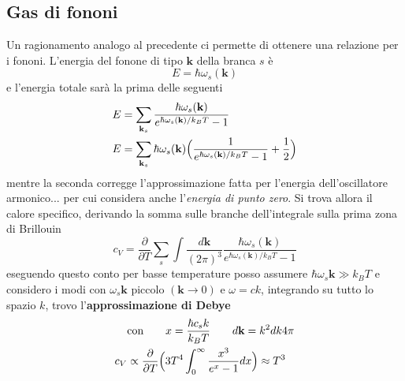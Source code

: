 \subsection{Gas di fononi}
Un ragionamento analogo al precedente ci permette di ottenere una relazione per i fononi.
L'energia del fonone di tipo $\textbf{k}$ della branca $s$ è
\begin{equation}
E = \hbar \omega_s (\textbf{k})
\end{equation}
e l'energia totale sarà la prima delle seguenti
\begin{equation}
\begin{split}
E & = \sum_{\textbf{k}_s} \frac{\hbar \omega_s(\textbf{k})}{e^{ \hbar \omega_s (\textbf{k}) / k_B T } - 1} \\
E & = \sum_{\textbf{k}_s} \hbar \omega_s(\textbf{k}) \Bigl(  \frac{1}{e^{ \hbar \omega_s (\textbf{k}) / k_B T } - 1} + \frac{1}{2}  \Bigr)
\end{split}
\end{equation}
mentre la seconda corregge l'approssimazione fatta per l'energia dell'oscillatore armonico...
per cui considera anche l'\textit{energia di punto zero}.
Si trova allora il calore specifico, derivando la somma sulle branche dell'integrale sulla prima zona di Brillouin
\begin{equation}
c_V = \frac{\partial}{\partial T} \sum_{s} \int 
\frac{d \textbf{k}}{(2\pi)^3} 
\frac{\hbar \omega_s(\textbf{k})}{e^{ \hbar \omega_s (\textbf{k}) / k_B T } - 1}
\end{equation}
eseguendo questo conto per basse temperature posso assumere $\hbar \omega_s \textbf{k} \gg k_B T$
e considero i modi con $\omega_s \textbf{k}$ piccolo $(\textbf{k} \to 0)$ e $\omega = c k$, integrando su tutto lo spazio $k$,
trovo l'\textbf{approssimazione di Debye}
\begin{equation}
\begin{split}
& \mbox{con} \quad\quad x = \frac{\hbar c_s k}{k_B T} \quad\quad d\textbf{k} = k^2 dk 4\pi \\
c_V & \propto \frac{\partial}{\partial T} \Bigl(  3 T^4 \int_0^{\infty} \frac{x^3}{e^x - 1} dx  \Bigr) \approx T^3
\end{split}
\end{equation}


